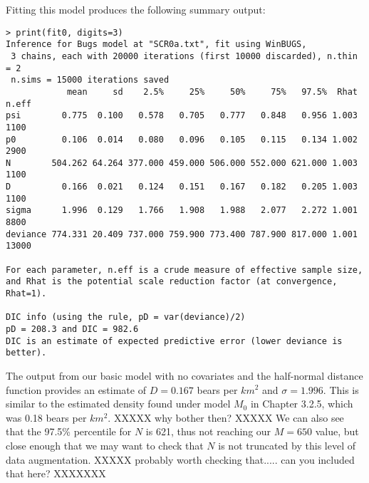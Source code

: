 Fitting this model produces the following summary output:
{\small 
\begin{verbatim}
> print(fit0, digits=3)
Inference for Bugs model at "SCR0a.txt", fit using WinBUGS,
 3 chains, each with 20000 iterations (first 10000 discarded), n.thin = 2
 n.sims = 15000 iterations saved
            mean     sd    2.5%     25%     50%     75%   97.5%  Rhat n.eff
psi        0.775  0.100   0.578   0.705   0.777   0.848   0.956 1.003  1100
p0         0.106  0.014   0.080   0.096   0.105   0.115   0.134 1.002  2900
N        504.262 64.264 377.000 459.000 506.000 552.000 621.000 1.003  1100
D          0.166  0.021   0.124   0.151   0.167   0.182   0.205 1.003  1100
sigma      1.996  0.129   1.766   1.908   1.988   2.077   2.272 1.001  8800
deviance 774.331 20.409 737.000 759.900 773.400 787.900 817.000 1.001 13000

For each parameter, n.eff is a crude measure of effective sample size,
and Rhat is the potential scale reduction factor (at convergence, Rhat=1).

DIC info (using the rule, pD = var(deviance)/2)
pD = 208.3 and DIC = 982.6
DIC is an estimate of expected predictive error (lower deviance is better).
\end{verbatim}
}
The output from our basic model with no covariates and the half-normal
distance function provides an estimate of $D = 0.167$ bears per $km^2$
and $\sigma = 1.996$.  This is similar to the estimated density found
under model $M_0$ in Chapter 3.2.5, which was 0.18 bears per $km^2$.
XXXXX why bother then? XXXXX  We can also see that the 97.5\%
percentile for $N$ is 621, thus not reaching our $M=650$ value, but
close enough that we may want to check that $N$ is not truncated by
this level of data augmentation.
XXXXX probably worth checking that..... can you included that here? XXXXXXX

